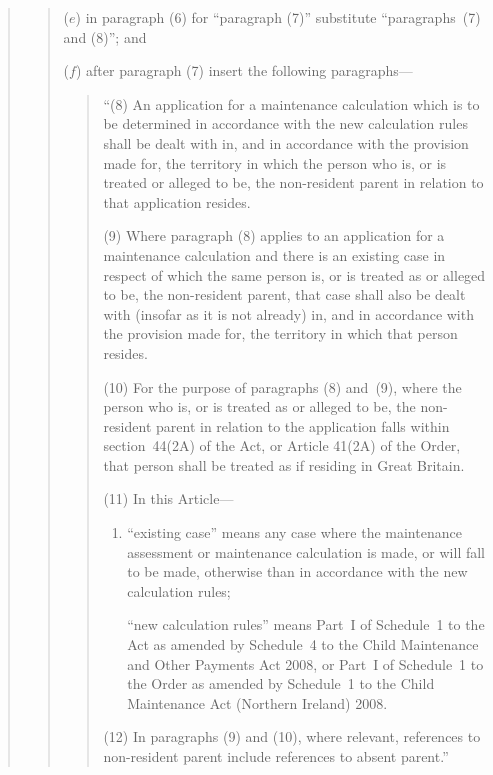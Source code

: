 \documentclass[12pt,a4paper]{article}
\begin{document}
\begin{quotation}
\begin{quotation}
\begin{enumerate}
($e$) in paragraph (6) for ``paragraph (7)'' substitute ``paragraphs~(7) and (8)''; and

\begin{sloppypar}
($f$) after paragraph (7) insert the following paragraphs—
\end{sloppypar}

\begin{quotation}
``(8) An application for a maintenance calculation which is to be determined in accordance with the new calculation rules shall be dealt with in, and in accordance with the provision made for, the territory in which the person who is, or is treated or alleged to be, the non-resident parent in relation to that application resides.

(9) Where paragraph (8) applies to an application for a maintenance calculation and there is an existing case in respect of which the same person is, or is treated as or alleged to be, the non-resident parent, that case shall also be dealt with (insofar as it is not already) in, and in accordance with the provision made for, the territory in which that person resides.

(10) For the purpose of paragraphs (8) and~(9), where the person who is, or is treated as or alleged to be, the non-resident parent in relation to the application falls within section~44(2A) of the Act, or Article 41(2A) of the Order, that person shall be treated as if residing in Great Britain.

(11) In this Article---
\begin{enumerate}\item[]
``existing case'' means any case where the maintenance assessment or maintenance calculation is made, or will fall to be made, otherwise than in accordance with the new calculation rules;

\enlargethispage{\baselineskip}

\begin{sloppypar}
``new calculation rules'' means Part~I of Schedule~1 to the Act as amended by Schedule~4 to the Child Maintenance and Other Payments Act 2008, or Part~I of Schedule~1 to the Order as amended by Schedule~1 to the Child Maintenance Act (Northern Ireland) 2008.
\end{sloppypar}
\end{enumerate}

(12) In paragraphs (9) and (10), where relevant, references to non-resident parent include references to absent parent.''
\end{quotation}
\end{enumerate}
\end{quotation}


\end{quotation}
\end{document}
